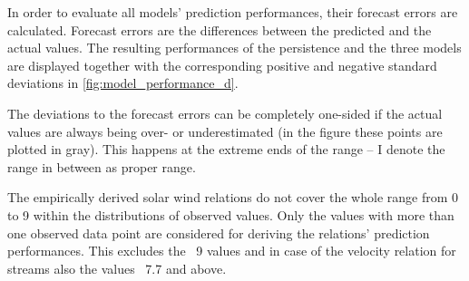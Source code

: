 In order to evaluate all models' prediction performances, their forecast errors are calculated. Forecast errors are the differences between the predicted and the actual values. The resulting performances of the persistence and the three models are displayed together with the corresponding positive and negative standard deviations in \autoref{fig:model_performance_d}.
\begin{figure}
\end{figure}
The deviations to the forecast errors can be completely one-sided if the actual \Kp{} values are always being over- or underestimated (in the figure these points are plotted in gray). This happens at the extreme ends of the \Kp{} range -- I denote the range in between as proper range.

The empirically derived solar wind relations do not cover the whole \Kp{} range from 0 to 9 within the distributions of observed values. Only the \Kp{} values with more than one observed data point are considered for deriving the relations' prediction performances. This excludes the \Kp{}~9 values and in case of the velocity relation for streams also the values \Kp{}~7.7 and above.

